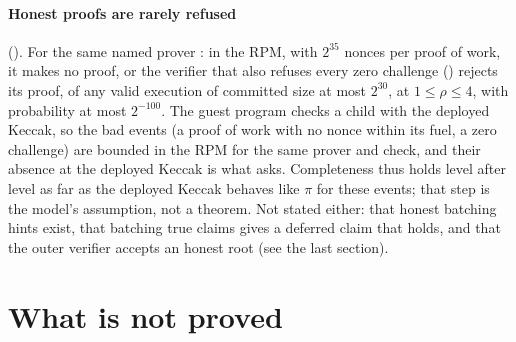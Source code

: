 \documentclass[11pt]{article}
\begin{document}
\paragraph{Honest proofs are rarely refused} (). For the same named
prover : in the RPM, with $2^{35}$ nonces per proof of work, it
makes no proof, or the verifier that also refuses every zero challenge
() rejects its proof, of any valid execution
of committed size at most $2^{30}$, at $1 \le \rho \le 4$, with probability at most $2^{-100}$. The
guest program checks a child with the deployed Keccak, so the bad events (a proof of work with no
nonce within its fuel, a zero challenge) are bounded in the
RPM for the same prover and check, and their absence at the deployed Keccak is what
 asks. Completeness thus holds level after level as far as the deployed Keccak
behaves like $\pi$ for these events; that step is the model's assumption, not a theorem. Not stated
either: that honest batching hints exist, that batching true claims gives a deferred claim that
holds, and that the outer verifier accepts an honest root (see the last section).

\section{What is not proved}
\end{document}
